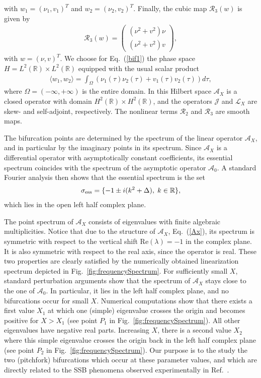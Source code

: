 %
with $w_1 =  (\nu_1, v_1)^T$ and $w_2 = (\nu_2, v_2)^T$.  
%
Finally, the cubic map $\mathcal{R}_{3} (w)$ is given by
%
\begin{align}
\mathcal{R}_3 (w) = \begin{pmatrix} (\nu^2 + v^2)\nu \\ (\nu^2 + v^2)v  \end{pmatrix},
\nonumber
\end{align}
%
with $w = (\nu, v)^T$.  
%
We choose for Eq.~(\ref{bif1}) the phase space $H = L^2(\mathbb{R}) \times L^2(\mathbb{R})$ equipped with the usual scalar product
%
\begin{align}
\langle w_1, w_2 \rangle = \int_\Omega (\nu_1(\tau)\nu_2(\tau) + v_1(\tau)v_2(\tau)) d\tau,
\nonumber
\end{align}
%
where $\Omega=(-\infty,+\infty)$ is the entire domain.
%
In this Hilbert space $\mathcal{A}_X$ is a closed operator with domain $H^2(\mathbb{R}) \times H^2 (\mathbb{R})$, and the operators $\mathcal{J}$ and $\mathcal{L}_X$ are skew- and self-adjoint, respectively.  The nonlinear terms $\mathcal{R}_{2}$ and $\mathcal{R}_3$ are smooth maps.
%

The bifurcation points are determined by the spectrum of the linear operator $\mathcal{A}_X$, and in particular by the imaginary points in its spectrum.  Since $\mathcal{A}_X$ is a differential operator with asymptotically constant coefficients, its essential spectrum coincides with the spectrum of the asymptotic operator $\mathcal{A}_0$.  A standard Fourier analysis then shows that the essential spectrum is the set
%
\begin{align}
\nonumber
\sigma_{\rm ess} = \{ -1 \pm i (k^2 + \Delta),  \; k \in \mathbb{R} \},
\end{align}
%
which lies in the open left half complex plane.
%

The point spectrum of $\mathcal{A}_X$ consists of eigenvalues with finite algebraic multiplicities.  Notice that due to the structure of $\mathcal{A}_X$, Eq.~(\ref{Ax}), its spectrum is symmetric with respect to the vertical shift 
Re$(\lambda) = -1$ in the complex plane.  It is also symmetric with respect to the real axis, since the operator is real.
%
These two properties are clearly satisfied by the numerically obtained
linearization spectrum depicted in Fig.~\ref{fig:frequencySpectrum}.
%
For sufficiently small $X$, standard perturbation arguments show that the spectrum of $\mathcal{A}_X$ stays close to the one of $\mathcal{A}_0$.  In particular, it lies in the left half complex plane, and no bifurcations occur for small $X$.  Numerical computations show that there exists a first value $X_1$ at which one (simple) eigenvalue crosses the origin and becomes positive for $X > X_1$
(see point $P_1$ in Fig.~\ref{fig:frequencySpectrum}).  
%
All other eigenvalues have negative real parts.  Increasing $X$, there is a second value $X_2$ where this simple eigenvalue crosses the origin back in the left half complex plane
(see point $P_2$ in Fig.~\ref{fig:frequencySpectrum}).
%
Our purpose is to the study the two (pitchfork) bifurcations which occur at 
these parameter values, and which are directly related
to the SSB phenomena observed experimentally in Ref.~\cite{XuCoen}.

